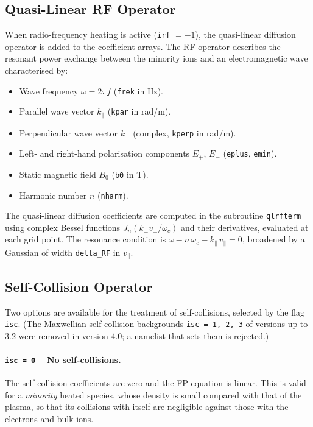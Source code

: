 \documentclass[11pt,a4paper]{article}
\newcommand{\vp}{v_\perp}
\newcommand{\vpa}{v_\parallel}
\begin{document}
\subsection{Quasi-Linear RF Operator}

When radio-frequency heating is active (\texttt{irf} $= -1$), the
quasi-linear diffusion operator is added to the coefficient arrays.  The RF
operator describes the resonant power exchange between the minority ions and
an electromagnetic wave characterised by:
\begin{itemize}
  \item Wave frequency $\omega = 2\pi f$ (\texttt{frek} in Hz).
  \item Parallel wave vector $k_\parallel$ (\texttt{kpar} in rad/m).
  \item Perpendicular wave vector $k_\perp$ (complex, \texttt{kperp}
        in rad/m).
  \item Left- and right-hand polarisation components $E_+$, $E_-$
        (\texttt{eplus}, \texttt{emin}).
  \item Static magnetic field $B_0$ (\texttt{b0} in T).
  \item Harmonic number $n$ (\texttt{nharm}).
\end{itemize}

The quasi-linear diffusion coefficients are computed in the subroutine
\texttt{qlrfterm} using complex Bessel functions $J_n(k_\perp \vp / \omega_c)$
and their derivatives, evaluated at each grid point.  The resonance condition
is $\omega - n\,\omega_c - k_\parallel\,\vpa = 0$, broadened by a Gaussian
of width \texttt{delta\_RF} in $\vpa$.

\subsection{Self-Collision Operator}

Two options are available for the treatment of self-collisions, selected by
the flag \texttt{isc}.  (The Maxwellian self-collision backgrounds \texttt{isc = 1, 2, 3} of
versions up to 3.2 were removed in version 4.0; a namelist that sets them is rejected.)

\paragraph{\texttt{isc = 0} -- No self-collisions.}
The self-collision coefficients are zero and the FP equation is linear.  This is valid for a
\emph{minority} heated species, whose density is small compared with that of the plasma, so that its
collisions with itself are negligible against those with the electrons and bulk ions.
\end{document}
